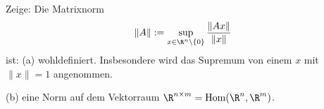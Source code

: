 \begin{prob}
Zeige: Die Matrixnorm 
$$
\|A\|:=\sup_{x\in \R^n\backslash\{0\}} \frac{\|Ax\|}{\|x\|}
$$
ist:
(a) wohldefiniert. Insbesondere wird das Supremum von einem $x$ mit $\|x\|=1$ angenommen.

(b) eine Norm auf dem Vektorraum $\R^{n\times m}= {\rm Hom}(\R^n,\R^m)$.
\end{prob}
